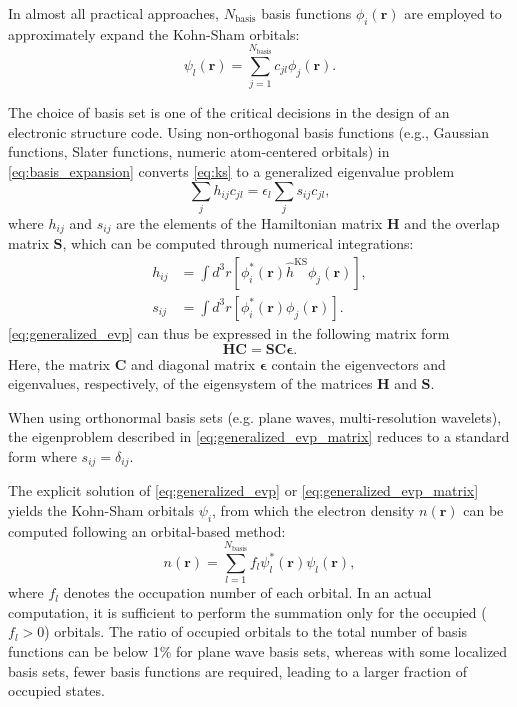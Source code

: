 \documentclass{report}
\begin{document}
In almost all practical approaches, $N_\text{basis}$ basis functions ${\phi_i(\boldsymbol{r})}$ are employed to approximately expand the Kohn-Sham orbitals:
\begin{equation}
\label{eq:basis_expansion}
\psi_l(\boldsymbol{r}) = \sum_{j=1}^{N_\text{basis}} c_{jl} \phi_j(\boldsymbol{r}) .
\end{equation}

The choice of basis set is one of the critical decisions in the design of an electronic structure code. Using non-orthogonal basis functions (e.g., Gaussian functions, Slater functions, numeric atom-centered orbitals) in \ref{eq:basis_expansion} converts \ref{eq:ks} to a generalized eigenvalue problem
\begin{equation}
\label{eq:generalized_evp}
\sum_j h_{ij} c_{jl} = \epsilon_l \sum_j s_{ij} c_{jl} ,
\end{equation}
where $h_{ij}$ and $s_{ij}$ are the elements of the Hamiltonian matrix $\boldsymbol{H}$ and the overlap matrix $\boldsymbol{S}$, which can be computed through numerical integrations:
\begin{equation}
\label{eq:ham_ovlp_integration}
\begin{split}
h_{ij} & = \int d^3 r [\phi_i^*(\boldsymbol{r}) \hat{h}^\text{KS} \phi_j(\boldsymbol{r})] ,\\
s_{ij} & = \int d^3 r [\phi_i^*(\boldsymbol{r}) \phi_j(\boldsymbol{r})] .
\end{split}
\end{equation}
\ref{eq:generalized_evp} can thus be expressed in the following matrix form
\begin{equation}
\label{eq:generalized_evp_matrix}
\boldsymbol{H} \boldsymbol{C} = \boldsymbol{S} \boldsymbol{C} \boldsymbol{\epsilon} .
\end{equation}
Here, the matrix $\boldsymbol{C}$ and diagonal matrix $\boldsymbol{\epsilon}$ contain the eigenvectors and eigenvalues, respectively, of the eigensystem of the matrices $\boldsymbol{H}$ and $\boldsymbol{S}$.

When using orthonormal basis sets (e.g. plane waves, multi-resolution wavelets), the eigenproblem described in \ref{eq:generalized_evp_matrix} reduces to a standard form where $s_{ij}=\delta_{ij}$.

The explicit solution of \ref{eq:generalized_evp} or \ref{eq:generalized_evp_matrix} yields the Kohn-Sham orbitals $\psi_i$, from which the electron density $n(\boldsymbol{r})$ can be computed following an orbital-based method:
\begin{equation}
\label{eq:orbital_update}
n(\boldsymbol{r}) = \sum_{l=1}^{N_\text{basis}} f_l \psi_l^*(\boldsymbol{r}) \psi_l(\boldsymbol{r}) ,
\end{equation}
where $f_l$ denotes the occupation number of each orbital. In an actual computation, it is sufficient to perform the summation only for the occupied ($f_l > 0$) orbitals. The ratio of occupied orbitals to the total number of basis functions can be below 1\% for plane wave basis sets, whereas with some localized basis sets, fewer basis functions are required, leading to a larger fraction of occupied states.
\end{document}

